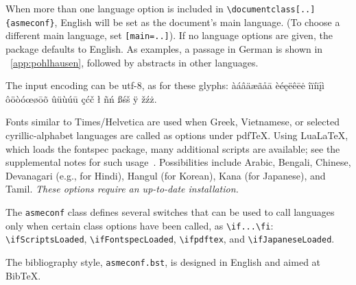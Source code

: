\documentclass[colorlinks,upint,subscriptcorrection,varvw,balance,loadscripts,german,vietamese]{asmeconf} %
\newcommand*\pdfTeX{pdf\TeX}
\newcommand*\LuaLaTeX{Lua\LaTeX}
\newcommand*\BibTeX{Bib\TeX}
\begin{document}
When more than one language option is included in \verb|\documentclass[..]{asmeconf}|, English will be 
set as the document's main language. (To choose a different main language, set \texttt{[main=..]}).
If no language options are given, the package defaults to English.  As examples, a passage in German is 
shown in  \appendixname~\ref{app:pohlhausen},
followed by abstracts in other languages.

The input encoding can be utf-8, as for these glyphs:
%
àáâäæãåā  èéęëêēė  îïíīįì ôöòóœøōõ ûüùúū çćč ł ñń ßśš ÿ žźż.

Fonts similar to Times/Helvetica are used when Greek, Vietnamese, or selected cyrillic-alphabet languages are called as options under {\upshape\pdfTeX}. Using {\upshape\LuaLaTeX}, which loads the fontspec package, many additional scripts are available; see the supplemental notes for such usage~\cite{lienhard2021}. Possibilities include Arabic, Bengali, Chinese, Devanagari (e.g., for Hindi), Hangul (for Korean), Kana (for Japanese), and Tamil. \emph{These options require an up-to-date \upshape{\LaTeX} installation.}

The \texttt{asmeconf} class defines several switches that can be used to call languages only when certain class options have been called, as \verb|\if...\fi|: \verb|\ifScriptsLoaded|, \verb|\ifFontspecLoaded|, \verb|\ifpdftex|, and \verb|\ifJapaneseLoaded|.

The bibliography style, \texttt{asmeconf.bst}, is designed in English and aimed at \BibTeX.  

\end{document}

